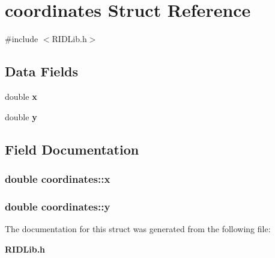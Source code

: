 \section{coordinates Struct Reference}
\label{structcoordinates}


{\ttfamily \#include $<$R\+I\+D\+Lib.\+h$>$}

\subsection*{Data Fields}
\begin{DoxyCompactItemize}
\item 
double {\bf x}
\item 
double {\bf y}
\end{DoxyCompactItemize}


\subsection{Field Documentation}
\subsubsection[{x}]{\setlength{\rightskip}{0pt plus 5cm}double coordinates\+::x}\label{structcoordinates_a45581bbcaadca00c6d858cc11189a4a2}
\subsubsection[{y}]{\setlength{\rightskip}{0pt plus 5cm}double coordinates\+::y}\label{structcoordinates_ae56a1217676316c5f030042fddef0cf2}


The documentation for this struct was generated from the following file\+:\begin{DoxyCompactItemize}
\item 
{\bf R\+I\+D\+Lib.\+h}\end{DoxyCompactItemize}
